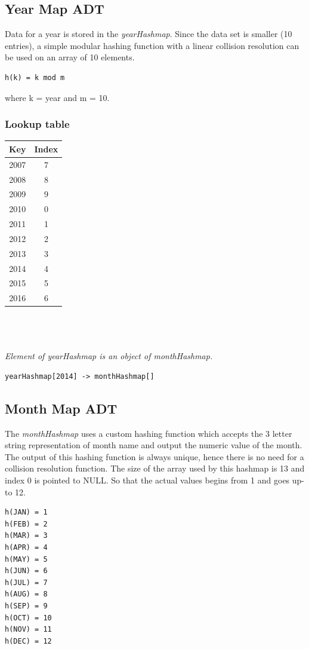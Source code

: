 \documentclass[12pt]{article}
\begin{document}
\subsection{Year Map ADT}
Data for a year is stored in the {\em yearHashmap}. Since the data set is smaller (10 entries), a simple modular hashing function with a linear collision resolution can be used on an array of 10 elements.
\begin{lstlisting}
h(k) = k mod m
\end{lstlisting}
where k = year and m = 10.
\subsubsection{Lookup table}
\begin{tabular}{| c | c |}
	\hline
	Key & Index \\
	\hline
	2007 & 7 \\
	\hline
	2008  & 8 \\
	\hline
	2009 & 9 \\
	\hline
	2010 & 0 \\
	\hline
	2011 & 1 \\
	\hline
	2012 & 2 \\
	\hline
	2013 & 3 \\
	\hline
	2014 & 4 \\
	\hline
	2015 & 5 \\
	\hline
	2016 & 6 \\
	\hline
\end{tabular}
\\ \\ \\
{\em Element of yearHashmap is an object of monthHashmap.}
\begin{lstlisting}
yearHashmap[2014] -> monthHashmap[]
\end{lstlisting}

\subsection{Month Map ADT}
The {\em monthHashmap} uses a custom hashing function which accepts the 3 letter string representation of month name and output the numeric value of the month. The output of this hashing function is always unique, hence there is no need for a collision resolution function. The size of the array used by this hashmap is 13 and index 0 is pointed to NULL. So that the actual values begins from 1 and goes up-to 12.
\begin{lstlisting}
h(JAN) = 1
h(FEB) = 2
h(MAR) = 3
h(APR) = 4
h(MAY) = 5
h(JUN) = 6
h(JUL) = 7
h(AUG) = 8
h(SEP) = 9
h(OCT) = 10
h(NOV) = 11
h(DEC) = 12
\end{lstlisting}
\end{document}
